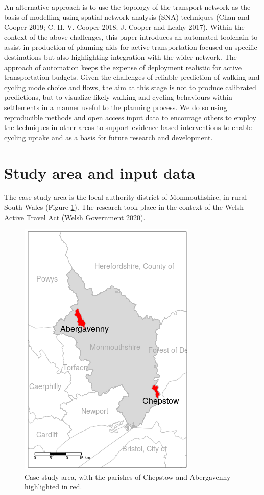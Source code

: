\documentclass[galley]{jtlu-article-2col}
\begin{document}
An alternative approach is to use the topology of the transport network as the basis of modelling using spatial network analysis (SNA) techniques (Chan and Cooper 2019; C. H. V. Cooper 2018; J. Cooper and Leahy 2017).
Within the context of the above challenges, this paper introduces an automated toolchain to assist in production of planning aids for active transportation focused on specific destinations but also highlighting integration with the wider network.
The approach of automation keeps the expense of deployment realistic for active transportation budgets. Given the challenges of reliable prediction of walking and cycling mode choice and flows, the aim at this stage is not to produce calibrated predictions, but to visualize likely walking and cycling behaviours within settlements in a manner useful to the planning process.
We do so using reproducible methods and open access input data to encourage others to employ the techniques in other areas to support evidence-based interventions to enable cycling uptake and as a basis for future research and development.

\hypertarget{study-area-and-input-data}{%
\section{Study area and input data}\label{study-area-and-input-data}}

The case study area is the local authority district of Monmouthshire, in rural South Wales (Figure \ref{fig:case}). The research took place in the context of the Welsh Active Travel Act (Welsh Government 2020).

\begin{figure}

{\centering \includegraphics[width=0.4\linewidth]{README_files/figure-gfm/study-area-cropped} 

}

\caption{Case study area, with the parishes of Chepstow and Abergavenny highlighted in red.}\label{fig:case}
\end{figure}
\end{document}

